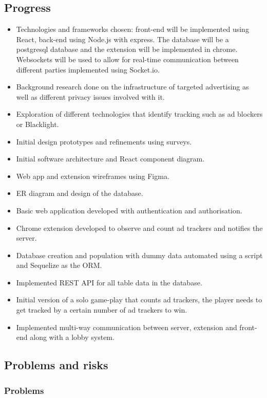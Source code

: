 \documentclass[11pt]{article}
\begin{document}
\subsection{Progress}\label{progress}

\begin{itemize}
\item  Technologies and frameworks chosen: front-end will be implemented using React, back-end using Node.js with express. The database will be a postgresql database and the extension will be implemented in chrome. Websockets will be used to allow for real-time communication between different parties implemented using Socket.io.
\item  Background research done on the infrastructure of targeted advertising as well as different privacy issues involved with it.
\item  Exploration of different technologies that identify tracking such as ad blockers or Blacklight.
\item  Initial design prototypes and refinements using surveys.
\item  Initial software architecture and React component diagram.
\item  Web app and extension wireframes using Figma.
\item  ER diagram and design of the database.
\item  Basic web application developed with authentication and authorisation.
\item  Chrome extension developed to observe and count ad trackers and notifies the server.
\item  Database creation and population with dummy data automated using a script and Sequelize as the ORM.
\item  Implemented REST API for all table data in the database.
\item  Initial version of a solo game-play that counts ad trackers, the player needs to get tracked by a certain number of ad trackers to win.
\item  Implemented multi-way communication between server, extension and front-end along with a lobby system.
\end{itemize}

\subsection{Problems and risks}\label{problems-and-risks}

\subsubsection{Problems}\label{problems}
\end{document}
